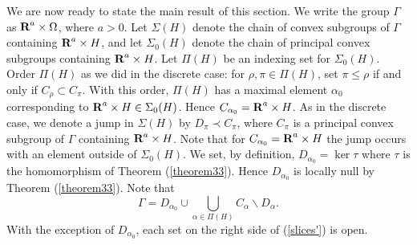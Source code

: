 We are now ready to state the main result of this section.  
%
We write the group $\Gamma$ as $\R^a\times \O$, 
where $a>0$.  Let $\Sigma(H)$ denote the 
chain of convex subgroups of 
$\Gamma$ containing $\R^a\times H$, and let 
$\Sigma_0 (H)$
denote the chain of principal 
convex subgroups containing $ \R^a\times H$. 
%
Let $\Pi(H)$ be an indexing set for 
$\Sigma_0(H)$.  Order $\Pi(H)$ as 
we did in the discrete case:  
%
for $\rho, \pi\in \Pi(H)$, 
set 
$\pi\leq\rho$ if and only 
if $C_\rho\subset C_\pi$.  
%
With this order, $\Pi(H)$ has a maximal 
element $\alpha_0$ corresponding to 
$\R^a\times H\in \Sigma_0(H)$.
%
Hence $C_{\alpha_0}=\R^a\times H$.  
%
As in the discrete case, we denote 
a jump in $\Sigma(H)$ by 
$D_\pi\prec C_\pi$, where $C_\pi$ 
is a principal convex subgroup of $\Gamma$
containing $\R^a\times H$.  
%
Note that for $C_{\alpha_0}=\R^a\times H$ 
the jump occurs with an element outside 
of $\Sigma_0(H)$.  
%
We set, by definition, 
$D_{\alpha_0}=\ker \tau$ where 
$\tau$ is the homomorphism of Theorem (\ref{theorem33}).  
Hence $D_{\alpha_0}$ is locally null by
Theorem (\ref{theorem33}).
%
%
Note that 
%
%
\begin{equation}
\Gamma=D_{\alpha_0}\cup 
\bigcup_{\alpha\in\Pi(H)} 
C_\alpha\backslash D_\alpha.
\label{slices'}
\end{equation}
%
%
% 
With the exception of 
$D_{\alpha_0}$, each set on the right 
side of (\ref{slices'}) is open.\\


